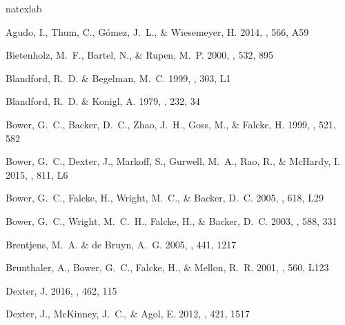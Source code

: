 \documentclass[12pt,preprint]{aastex}
\begin{document}
\begin{thebibliography}{34}
\expandafter\ifx\csname natexlab\endcsname\relax\def\natexlab#1{#1}\fi

{Agudo}, I., {Thum}, C., {G{\'o}mez}, J.~L., \& {Wiesemeyer}, H. 2014, \aap,
  566, A59

{Bietenholz}, M.~F., {Bartel}, N., \& {Rupen}, M.~P. 2000, \apj, 532, 895

{Blandford}, R.~D. \& {Begelman}, M.~C. 1999, \mnras, 303, L1

{Blandford}, R.~D. \& {Konigl}, A. 1979, \apj, 232, 34

{Bower}, G.~C., {Backer}, D.~C., {Zhao}, J.~H., {Goss}, M., \& {Falcke}, H.
  1999, \apj, 521, 582

{Bower}, G.~C., {Dexter}, J., {Markoff}, S., {Gurwell}, M.~A., {Rao}, R., \&
  {McHardy}, I. 2015, \apjl, 811, L6

{Bower}, G.~C., {Falcke}, H., {Wright}, M.~C., \& {Backer}, D.~C. 2005, \apjl,
  618, L29

{Bower}, G.~C., {Wright}, M.~C.~H., {Falcke}, H., \& {Backer}, D.~C. 2003,
  \apj, 588, 331

{Brentjens}, M.~A. \& {de Bruyn}, A.~G. 2005, \aap, 441, 1217

{Brunthaler}, A., {Bower}, G.~C., {Falcke}, H., \& {Mellon}, R.~R. 2001, \apjl,
  560, L123

{Dexter}, J. 2016, \mnras, 462, 115

{Dexter}, J., {McKinney}, J.~C., \& {Agol}, E. 2012, \mnras, 421, 1517


\end{thebibliography}
\end{document}
